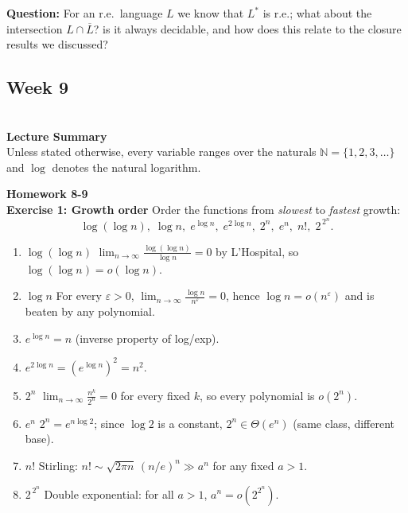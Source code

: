 \documentclass{article}
\theoremstyle{theorem}
\theoremstyle{definition}
\theoremstyle{remark}
\begin{document}
\textbf{Question: } For an r.e.\ language \(L\) we know that \(L^{*}\) is r.e.; what about the intersection  
        \(L \cap \overline{L}\)? is it always decidable, and how does this relate to the closure results we discussed?


\subsection{\textbf{Week 9}}\\
\textbf{Lecture Summary}
\\Unless stated otherwise, every variable ranges over the naturals $\mathbb N=\{1,2,3,\dots\}$ and $\log$ denotes the natural logarithm.

\textbf{Homework 8-9}\\
\textbf{Exercise 1: Growth order}
Order the functions from \emph{slowest} to \emph{fastest} growth:
\[
\log(\log n),\;
\log n,\;
e^{\log n},\;
e^{2\log n},\;
2^{n},\;
e^{n},\;
n!,\;
2^{\,2^{n}}.
\]

\begin{enumerate}
  \item $\log(\log n)$ \quad 
        $\displaystyle\lim_{n\to\infty}\frac{\log(\log n)}{\log n}=0$  
        by L’Hospital, so $\log(\log n)=o(\log n)$.

  \item $\log n$ \quad 
        For every $\varepsilon>0$, $\displaystyle\lim_{n\to\infty}\frac{\log n}{n^\varepsilon}=0$,  
        hence $\log n=o(n^\varepsilon)$ and is beaten by any polynomial.        

  \item $e^{\log n}=n$ \quad (inverse property of log/exp).

  \item $e^{2\log n}=(e^{\log n})^{2}=n^{2}$.

  \item $2^{n}$ \quad 
        $\displaystyle\lim_{n\to\infty}\frac{n^{k}}{2^{n}}=0$ for every fixed $k$,  
        so every polynomial is $o(2^{n})$.

  \item $e^{n}$ \quad  
        $2^{n}=e^{n\log 2}$; since $\log 2$ is a constant,  
        $2^{n}\in\Theta(e^{n})$ (same class, different base).

  \item $n!$ \quad  
        Stirling: $n!\sim\sqrt{2\pi n}\,(n/e)^{n}\gg a^{n}$ for any fixed $a>1$.

  \item $2^{\,2^{n}}$ \quad  
        Double exponential: for all $a>1$, $a^{n}=o(2^{2^{n}})$.
\end{enumerate}
\end{document}
